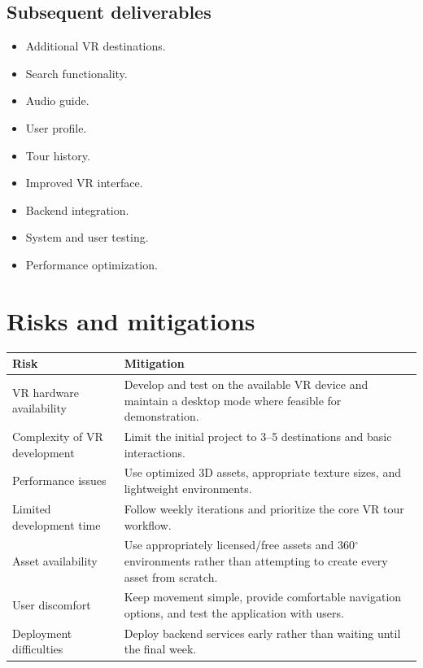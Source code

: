 \documentclass[11pt,a4paper]{article}
\begin{document}
\subsection{Subsequent deliverables}

\begin{itemize}[leftmargin=0.7cm]
    \item Additional VR destinations.
    \item Search functionality.
    \item Audio guide.
    \item User profile.
    \item Tour history.
    \item Improved VR interface.
    \item Backend integration.
    \item System and user testing.
    \item Performance optimization.
\end{itemize}

\section{Risks and mitigations}

\begin{center}
\begin{tabular}{p{} p{}}
\textbf{Risk} & \textbf{Mitigation} \\ \hline
VR hardware availability &
Develop and test on the available VR device and maintain a desktop mode where feasible for demonstration. \\[4pt]

Complexity of VR development &
Limit the initial project to 3--5 destinations and basic interactions. \\[4pt]

Performance issues &
Use optimized 3D assets, appropriate texture sizes, and lightweight environments. \\[4pt]

Limited development time &
Follow weekly iterations and prioritize the core VR tour workflow. \\[4pt]

Asset availability &
Use appropriately licensed/free assets and 360$^\circ$ environments rather than attempting to create every asset from scratch. \\[4pt]

User discomfort &
Keep movement simple, provide comfortable navigation options, and test the application with users. \\[4pt]

Deployment difficulties &
Deploy backend services early rather than waiting until the final week.
\end{tabular}
\end{center}
\end{document}

